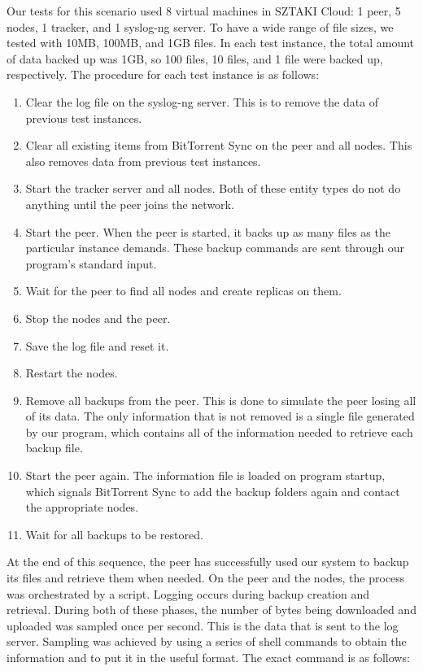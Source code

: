 \documentclass[12pt]{report}
\begin{document}
Our tests for this scenario used 8 virtual machines in SZTAKI Cloud: 1 peer, 5 nodes, 1 tracker, and 1 syslog-ng server. To have a wide range of file sizes, we tested with 10MB, 100MB, and 1GB files. In each test instance, the total amount of data backed up was 1GB, so 100 files, 10 files, and 1 file were backed up, respectively. The procedure for each test instance is as follows:

\begin{enumerate}
  \item Clear the log file on the syslog-ng server. This is to remove the data of previous test instances.
  \item Clear all existing items from BitTorrent Sync on the peer and all nodes. This also removes data from previous test instances.
  \item Start the tracker server and all nodes. Both of these entity types do not do anything until the peer joins the network.
  \item Start the peer. When the peer is started, it backs up as many files as the particular instance demands. These backup commands are sent through our program's standard input.
  \item Wait for the peer to find all nodes and create replicas on them.
  \item Stop the nodes and the peer.
  \item Save the log file and reset it.
  \item Restart the nodes.
  \item Remove all backups from the peer. This is done to simulate the peer losing all of its data. The only information that is not removed is a single file generated by our program, which contains all of the information needed to retrieve each backup file.
  \item Start the peer again. The information file is loaded on program startup, which signals BitTorrent Sync to add the backup folders again and contact the appropriate nodes.
  \item Wait for all backups to be restored.
\end{enumerate}

At the end of this sequence, the peer has successfully used our system to backup its files and retrieve them when needed. On the peer and the nodes, the process was orchestrated by a script. Logging occurs during backup creation and retrieval. During both of these phases, the number of bytes being downloaded and uploaded was sampled once per second. This is the data that is sent to the log server. Sampling was achieved by using a series of shell commands to obtain the information and to put it in the useful format. The exact command is as follows:
\end{document}
